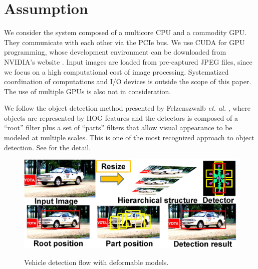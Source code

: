 \section{Assumption}
\label{sec:assumption}

We consider the system composed of a multicore CPU and a commodity GPU.
They communicate with each other via the PCIe bus.
We use CUDA \cite{NVIDIA_CUDA} for GPU programming, whose development
environment can be downloaded from NVIDIA's website \cite{NVIDIA_NVCC}.
Input images are loaded from pre-captured JPEG files, since we focus on
a high computational cost of image processing.
Systematized coordination of computations and I/O devices is outside the
scope of this paper.
The use of multiple GPUs is also not in consideration.

We follow the object detection method presented by Felzenszwalb
\textit{et. al.} \cite{Felzenszwalb10}, where objects are represented by
HOG features \cite{Dalal05} and the detectors is composed of a ``root''
filter plus a set of ``parts'' filters that allow visual appearance to
be modeled at multiple scales.
This is one of the most recognized approach to object detection.
See \cite{Felzenszwalb10} for the detail.

\begin{figure}[t]
 \begin{center}
  \includegraphics[width=0.95\hsize]{fig/deformable_model.eps}\\
  \caption{Vehicle detection flow with deformable models.}
  \label{fig:deformable_model}
 \end{center}
\end{figure}

